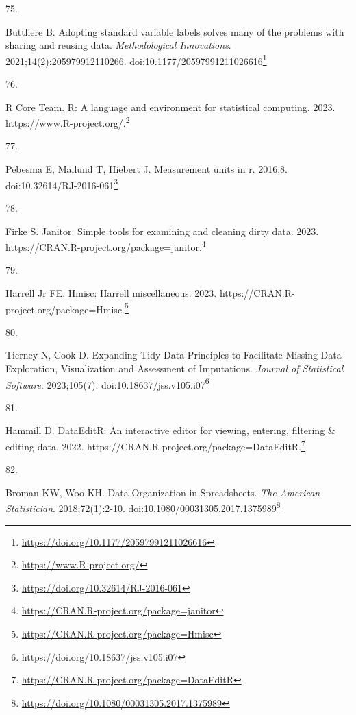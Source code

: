 \documentclass[
  a4paper,
]{book}
\newlength{\cslhangindent}
\newlength{\csllabelwidth}
\newlength{\cslentryspacingunit} %
\newenvironment{CSLReferences}[2] %
 {%
  \setlength{\parindent}{0pt}
  \ifodd #1
  \let\oldpar\par
  \def\par{\hangindent=\cslhangindent\oldpar}
  \fi
  \setlength{\parskip}{#2\cslentryspacingunit}
 }%
 {}
\newcommand{\CSLLeftMargin}[1]{\parbox[t]{\csllabelwidth}{#1}}
\newcommand{\CSLRightInline}[1]{\parbox[t]{\linewidth - \csllabelwidth}{#1}\break}
\renewcommand{\href}[2]{#2\footnote{\url{#1}}}
\begin{document}
\begin{CSLReferences}{0}{0}
\leavevmode{}%
\CSLLeftMargin{75. }%
\CSLRightInline{Buttliere B. Adopting standard variable labels solves many of the problems with sharing and reusing data. \emph{Methodological Innovations}. 2021;14(2):205979912110266. doi:\href{https://doi.org/10.1177/20597991211026616}{10.1177/20597991211026616}}

\leavevmode{}%
\CSLLeftMargin{76. }%
\CSLRightInline{R Core Team. R: A language and environment for statistical computing. 2023. \href{https://www.R-project.org/}{https://www.R-project.org/.}}

\leavevmode{}%
\CSLLeftMargin{77. }%
\CSLRightInline{Pebesma E, Mailund T, Hiebert J. Measurement units in {\textbraceleft}r{\textbraceright}. 2016;8. doi:\href{https://doi.org/10.32614/RJ-2016-061}{10.32614/RJ-2016-061}}

\leavevmode{}%
\CSLLeftMargin{78. }%
\CSLRightInline{Firke S. Janitor: Simple tools for examining and cleaning dirty data. 2023. \href{https://CRAN.R-project.org/package=janitor}{https://CRAN.R-project.org/package=janitor.}}

\leavevmode{}%
\CSLLeftMargin{79. }%
\CSLRightInline{Harrell Jr FE. Hmisc: Harrell miscellaneous. 2023. \href{https://CRAN.R-project.org/package=Hmisc}{https://CRAN.R-project.org/package=Hmisc.}}

\leavevmode{}%
\CSLLeftMargin{80. }%
\CSLRightInline{Tierney N, Cook D. Expanding Tidy Data Principles to Facilitate Missing Data Exploration, Visualization and Assessment of Imputations. \emph{Journal of Statistical Software}. 2023;105(7). doi:\href{https://doi.org/10.18637/jss.v105.i07}{10.18637/jss.v105.i07}}

\leavevmode{}%
\CSLLeftMargin{81. }%
\CSLRightInline{Hammill D. DataEditR: An interactive editor for viewing, entering, filtering \& editing data. 2022. \href{https://CRAN.R-project.org/package=DataEditR}{https://CRAN.R-project.org/package=DataEditR.}}

\leavevmode{}%
\CSLLeftMargin{82. }%
\CSLRightInline{Broman KW, Woo KH. Data Organization in Spreadsheets. \emph{The American Statistician}. 2018;72(1):2-10. doi:\href{https://doi.org/10.1080/00031305.2017.1375989}{10.1080/00031305.2017.1375989}}


\end{CSLReferences}
\end{document}
